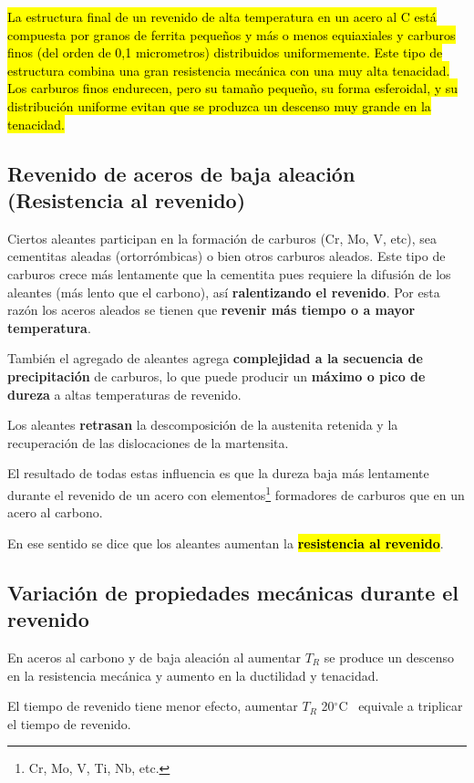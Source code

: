 \documentclass{article}
\newcommand{\grad}{\ensuremath{^\circ \mathrm{C}}}
\begin{document}
\hl{La estructura final de un revenido de alta temperatura en un acero al C
está compuesta por granos de ferrita pequeños y más o menos equiaxiales
y carburos finos (del orden de 0,1 micrometros) distribuidos uniformemente. Este
tipo de estructura combina una gran resistencia mecánica con una
muy alta tenacidad. Los carburos finos endurecen, pero su tamaño
pequeño, su forma esferoidal, y su distribución uniforme evitan que se
produzca un descenso muy grande en la tenacidad.}

\subsection[Resistencia al revenido]{Revenido de aceros de baja aleación (Resistencia al revenido)}

Ciertos aleantes participan en la formación de carburos (Cr, Mo, V, etc), sea cementitas aleadas (ortorrómbicas) o bien otros carburos aleados. Este tipo de carburos crece más lentamente que la cementita pues requiere la difusión de los aleantes (más lento que el carbono), así \textbf{ralentizando el revenido}. Por esta razón los aceros aleados se tienen que \textbf{revenir más tiempo o a mayor temperatura}.

También el agregado de aleantes agrega \textbf{complejidad a la secuencia de precipitación} de carburos, lo que puede producir un \textbf{máximo o pico de dureza} a altas temperaturas de revenido.

Los aleantes \textbf{retrasan} la descomposición de la austenita retenida y la recuperación de las dislocaciones de la martensita.



El resultado de todas estas influencia es que la dureza baja más lentamente durante el revenido de un acero con elementos\footnote{Cr, Mo, V, Ti, Nb, etc.} formadores de carburos que en un acero al carbono.

En ese sentido se dice que los aleantes aumentan la \hl{\textbf{resistencia al revenido}}. \cite{guille}

\subsection{Variación de propiedades mecánicas durante el revenido}
En aceros al carbono y de baja aleación al aumentar $T_R$ se produce un descenso en la resistencia mecánica y aumento en la ductilidad y tenacidad. 

El tiempo de revenido tiene menor efecto, aumentar $T_R$ 20\grad~ equivale a triplicar el tiempo de revenido.
\end{document}
